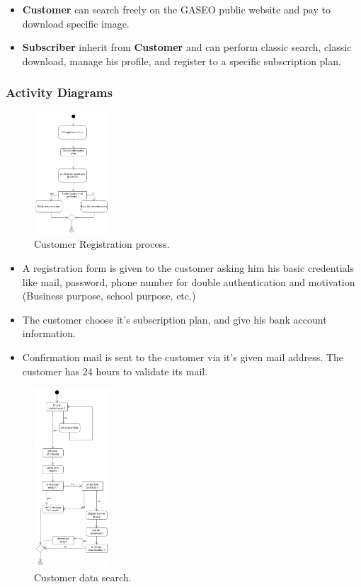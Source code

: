 \documentclass[12pt]{article}
\begin{document}
\begin{itemize}
  \item \textbf{Customer} can search freely on the GASEO public website and pay to download specific image.
  \item \textbf{Subscriber} inherit from \textbf{Customer} and can perform classic search, classic download, manage his profile, and register to a specific subscription plan.
\end{itemize}


\subsubsection*{Activity Diagrams}

\begin{figure}[h]
    \centering
    \includegraphics[width=0.25\textwidth]{Figures/Business Processes/Activity_1.png}
    \caption{Customer Registration process.}
\end{figure}

\begin{itemize}
    \item A registration form is given to the customer asking him his basic credentials like mail, password, phone number for double authentication and motivation (Business purpose, school purpose, etc.)
    \item The customer choose it's subscription plan, and give his bank account information.
    \item Confirmation mail is sent to the customer via it's given mail address. The customer has 24 hours to validate its mail.
\end{itemize}

\begin{figure}[h]
    \centering
    \includegraphics[width=0.25\textwidth]{Figures/Business Processes/Activity_2.png}
    \caption{Customer data search.}
\end{figure}
\end{document}
